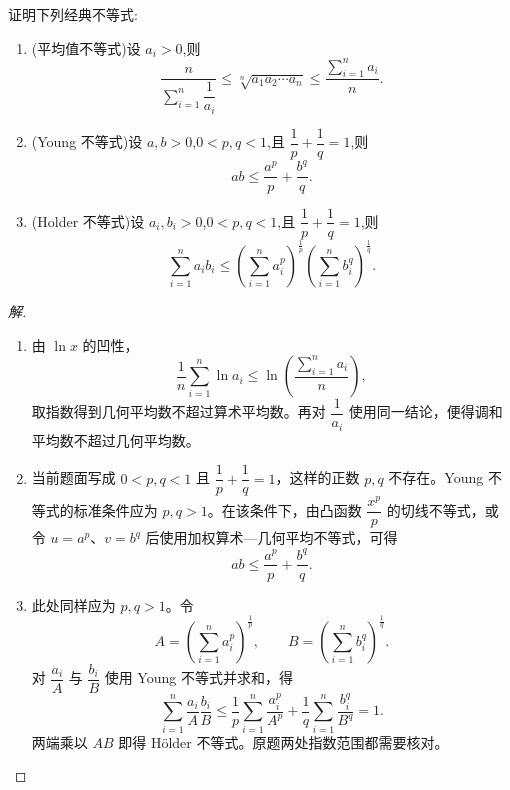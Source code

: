 \documentclass[../../数学分析培优讲义(答案版).tex]{subfiles}
\begin{document}
\begin{example}[\markstar]
证明下列经典不等式:
\begin{enumerate}[label=(\arabic*)]
    \item (平均值不等式)设 $a_i>0$,则
    \[
        \dfrac{n}{\displaystyle\sum\limits_{i=1}^n\dfrac{1}{a_i}}
        \leq\sqrt[n]{a_1a_2\cdots a_n}
        \leq\dfrac{\displaystyle\sum\limits_{i=1}^n a_i}{n}.
    \]
    \item (Young 不等式)设 $a,b>0$,$0<p,q<1$,且 $\dfrac{1}{p}+\dfrac{1}{q}=1$,则
    \[
        ab\leq\dfrac{a^p}{p}+\dfrac{b^q}{q}.
    \]
    \item (Holder 不等式)设 $a_i,b_i>0$,$0<p,q<1$,且 $\dfrac{1}{p}+\dfrac{1}{q}=1$,则
    \[
        \sum\limits_{i=1}^n a_i b_i
        \leq
        \left(\sum\limits_{i=1}^n a_i^p\right)^{\frac{1}{p}}
        \left(\sum\limits_{i=1}^n b_i^q\right)^{\frac{1}{q}}.
    \]
\end{enumerate}
\end{example}

\begin{proof}[解]
\begin{enumerate}[label=(\arabic*)]
    \item 由 $\ln x$ 的凹性，
    \[
        \dfrac{1}{n}\sum\limits_{i=1}^{n}\ln a_i
        \leq\ln\left(\dfrac{\displaystyle\sum\limits_{i=1}^{n}a_i}{n}\right),
    \]
    取指数得到几何平均数不超过算术平均数。再对 $\dfrac{1}{a_i}$ 使用同一结论，便得调和平均数不超过几何平均数。

    \item 当前题面写成 $0<p,q<1$ 且 $\dfrac{1}{p}+\dfrac{1}{q}=1$，这样的正数 $p,q$ 不存在。Young 不等式的标准条件应为 $p,q>1$。在该条件下，由凸函数 $\dfrac{x^p}{p}$ 的切线不等式，或令 $u=a^p$、$v=b^q$ 后使用加权算术—几何平均不等式，可得
    \[
        ab\leq\dfrac{a^p}{p}+\dfrac{b^q}{q}.
    \]

    \item 此处同样应为 $p,q>1$。令
    \[
        A=\left(\sum\limits_{i=1}^{n}a_i^p\right)^{\frac{1}{p}},
        \qquad
        B=\left(\sum\limits_{i=1}^{n}b_i^q\right)^{\frac{1}{q}}.
    \]
    对 $\dfrac{a_i}{A}$ 与 $\dfrac{b_i}{B}$ 使用 Young 不等式并求和，得
    \[
        \sum\limits_{i=1}^{n}\dfrac{a_i}{A}\dfrac{b_i}{B}
        \leq\dfrac{1}{p}\sum\limits_{i=1}^{n}\dfrac{a_i^p}{A^p}
        +\dfrac{1}{q}\sum\limits_{i=1}^{n}\dfrac{b_i^q}{B^q}
        =1.
    \]
    两端乘以 $AB$ 即得 Hölder 不等式。原题两处指数范围都需要核对。
\end{enumerate}
\end{proof}
\end{document}
